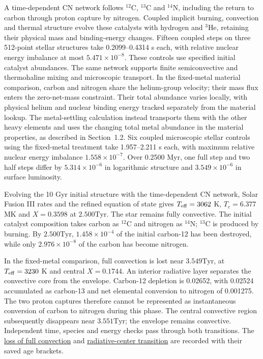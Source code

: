\documentclass[11pt,letterpaper]{article}
\newcommand{\Tyr}{\mathrm{Tyr}}
\newcommand{\doc}[2]{\href{https://github.com/oklo/ember/blob/codex/atmosphere5000-density-checks/#1}{#2}}
\begin{document}
A time-dependent CN network follows $^{12}$C, $^{13}$C and $^{14}$N,
including the return to carbon through proton capture by nitrogen. Coupled
implicit burning, convection and thermal structure evolve these catalysts
with hydrogen and $^3$He, retaining their physical mass and binding-energy
changes. Fifteen coupled steps on three 512-point stellar structures take
0.2099--0.4314 s each, with relative nuclear energy imbalance at most
$5.471\times10^{-8}$. These controls use specified initial catalyst
abundances. The same network supports finite semiconvective and thermohaline
mixing and microscopic transport. In the fixed-metal material comparison,
carbon and nitrogen share the helium-group velocity; their mass flux enters
the zero-net-mass constraint. Their total abundance varies locally, with
physical helium and nuclear binding energy tracked separately from the
material lookup. The metal-settling calculation instead transports them
with the other heavy elements and uses the changing total metal abundance
in the material properties, as described in Section~1.2.
Six coupled microscopic stellar controls using the fixed-metal treatment take
1.957--2.211 s each, with maximum relative nuclear energy imbalance
$1.558\times10^{-7}$. Over 0.2500 Myr, one full step and two half steps
differ by $5.314\times10^{-6}$ in logarithmic structure and
$3.549\times10^{-6}$ in surface luminosity.

Evolving the 10 Gyr initial structure with the time-dependent CN network,
Solar Fusion III rates and the refined equation of state gives
$T_{\rm eff}=3062$ K, $T_c=6.377$ MK and $X=0.3598$ at $2.500\Tyr$.
The star remains fully convective. The initial catalyst composition takes
carbon as $^{12}$C and nitrogen as $^{14}$N; $^{13}$C is produced by burning.
By $2.500\Tyr$, $1.458\times10^{-4}$ of the initial carbon-12 has been
destroyed, while only $2.976\times10^{-8}$ of the carbon has become nitrogen.

In the fixed-metal comparison, full convection is lost near $3.549\Tyr$,
at $T_{\rm eff}=3230$ K and
central $X=0.1744$. An interior radiative layer separates the convective
core from the envelope. Carbon-12 depletion is 0.02652, with 0.02524
accumulated as carbon-13 and net elemental conversion to nitrogen of
0.001275. The two proton captures therefore cannot be represented as
instantaneous conversion of carbon to nitrogen during this phase.
The central convective region subsequently disappears near $3.551\Tyr$;
the envelope remains convective. Independent time, species and energy
checks pass through both transitions. The
\doc{docs/results/cn_consistent_first_layer_v1.json}{loss of full convection}
and \doc{docs/results/cn_consistent_core_disappearance_v1.json}{radiative-center transition}
are recorded with their saved age brackets.
\end{document}

